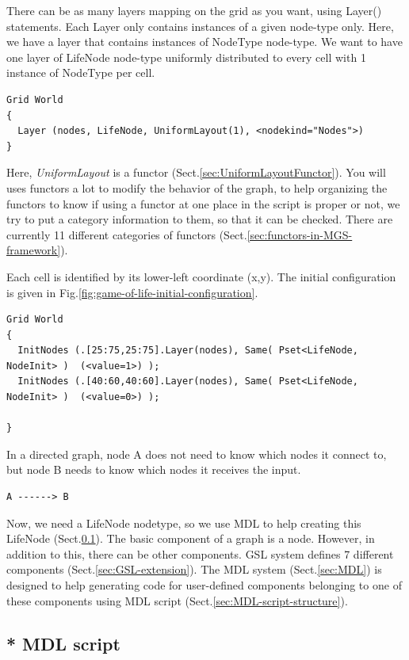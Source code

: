 There can be as many layers mapping on the grid as you want, using Layer()
statements. Each Layer only contains instances of a given node-type only.
Here, we have a layer that contains instances of NodeType node-type.
We want to have one layer of LifeNode node-type uniformly distributed to every
cell with 1 instance of NodeType per cell. 
\begin{verbatim}
Grid World
{
  Layer (nodes, LifeNode, UniformLayout(1), <nodekind="Nodes">)
}
\end{verbatim}

Here, {\it UniformLayout} is a functor (Sect.\ref{sec:UniformLayoutFunctor}).
You will uses functors a lot to modify the behavior of the graph, to help organizing the functors to know if using a
functor at one place in the script is proper or not, we try to put a category
information to them, so that it can be checked. There are currently 11 different
categories of functors (Sect.\ref{sec:functors-in-MGS-framework}).


\label{sec:GameofLife-GSL-InitNodes}
Each cell is identified by its lower-left coordinate
(x,y). The initial configuration is given in
Fig.\ref{fig:game-of-life-initial-configuration}.
{\it
\begin{verbatim}
Grid World
{
  InitNodes (.[25:75,25:75].Layer(nodes), Same( Pset<LifeNode, NodeInit> )  (<value=1>) );
  InitNodes (.[40:60,40:60].Layer(nodes), Same( Pset<LifeNode, NodeInit> )  (<value=0>) );
  
}
\end{verbatim}
}

In a directed graph, node A does not need to know which nodes it connect to, but
node B needs to know which nodes it receives the input.
\begin{verbatim}
A ------> B
\end{verbatim}


Now, we need a LifeNode nodetype, so we use MDL to help creating this LifeNode
(Sect.\ref{sec:MDL-script-game-of-life}). The basic component of a graph is a
node. However, in addition to this, there can be other components. GSL system
defines 7 different components (Sect.\ref{sec:GSL-extension}). The MDL system
(Sect.\ref{sec:MDL}) is designed to help generating code for user-defined
components belonging to one of these components using MDL script
(Sect.\ref{sec:MDL-script-structure}).


\subsection{* MDL script}
\label{sec:MDL-script-game-of-life}

